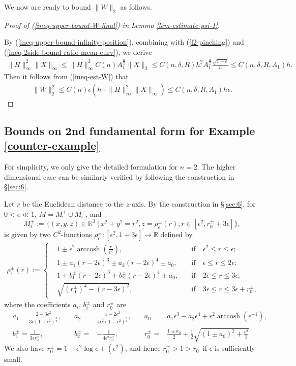 \documentclass{amsart}
\numberwithin{equation}{section}
\theoremstyle{remark}
\renewcommand{\(}{\left(}
\renewcommand{\)}{\right)}
\renewcommand{\~}{\tilde}
\renewcommand{\-}{\overline}
\newcommand{\R}{\mathbb{R}}
\renewcommand{\d}{\delta}
\newcommand{\e}{\epsilon}
\newcommand{\ra}{\rightarrow}
\begin{document}
We now are ready to bound $\|W\|_2$ as follows.
\vspace{2mm}
\begin{proof}[Proof of (\ref{ineq-upper-bound-W-final}) in Lemma \ref{lem-estimate-psi-1}]
	~
	
	By (\ref{ineq-upper-bound-infinity-position}), combining with (\ref{l2-pinching}) and (\ref{ineq-2side-bound-ratio-mean-curv}), we derive
	\begin{align*}
	\|H\|^2_\infty\|X\|_\infty \leq \|H\|_\infty^2 C(n)A_1^{\frac{n}{2}}\|X\|_2\leq C(n,\d,R)h^2 A_1^{\frac{n}{2}}\frac{\sqrt{1+\e}}{h} \leq C(n,\d,R,A_1)h.
	\end{align*}
	Then it follows from (\ref{ineq-est-W}) that
	\begin{align}\label{4.13}
	\|W\|_2^2 \leq C(n)\e(h+\|H\|_\infty^2 \|X\|_\infty) \leq C(n,\d,R,A_1)h \e.
	\end{align}
	
\end{proof}

\subsection{Bounds on 2nd fundamental form for Example \ref{counter-example}}\label{subsec-2nd-fund}

For simplicity, we only give the detailed formulation for $n=2$. The higher dimensional case can be similarly verified by following the construction in \S \ref{sec:6}.

Let $r$ be the Euclidean distance to the $z$-axis. By the construction in \S \ref{sec:6}, for $0<\e \ll 1$, $M=M_\e^{+}\cup M_\e^{-}$, and
$$M_\e^{\pm}:=\{(x,y,z)\in \mathbb R^3 ~|~x^2+y^2=r^2, z= \rho^{\pm}_\e(r), r\in [\epsilon^2,r_0^{\pm}+3\e]\},$$
is given by two $C^2$-functions $\rho_\e^{\pm}:[\e^2,1+3\e]\ra \R$ defined by
\begin{align*}
\rho^{\pm}_\e(r):=\left\{\begin{aligned}
&1\pm\e^2 \operatorname{arccosh}\(\frac{r}{\e^2}\), \quad &\text{if}~&\e^2 \leq r \leq \e;\\
&1 \pm a_1 (r-2\e)^3 \pm a_2 (r-2\e)^4 \pm a_0,   \quad &\text{if}~&\e   \leq r \leq 2\e;\\
&1+b_1^{\pm} (r-2\e)^3+b_2^{\pm} (r-2\e)^4 \pm a_0,   \quad &\text{if}~&2\e  \leq r \leq 3\e;\\
&\sqrt{(r_0^{\pm})^2-(r-3\e)^2},          \quad &\text{if}~&3\e  \leq r \leq 3\e+r_0^{\pm},
\end{aligned}
\right.
\end{align*}
where the coefficients $a_i$, $b_i^{\pm}$ and $r_0^\pm$ are
\begin{align*}
&a_1=\frac{2-3\e^2}{3\e(1-\e^2)^\frac{3}{2}}, \quad &a_2=&\frac{1-2\e^2}{4\e^2(1-\e^2)^\frac{3}{2}}, \quad &a_0=&a_1\e^3-a_2 \e^4+\e^2 \operatorname{arccosh}(\e^{-1}),\\
&b_1^{\pm}=\frac{1}{3\e r_0^\pm},           \quad &b_2^{\pm}=&-\frac{1}{4\e^2 r_0^\pm}, \quad &r_0^\pm=&\frac{1\pm a_0}{2}+\frac{1}{2}\sqrt{(1\pm a_0)^2+\frac{\e^2}{3}}
\end{align*}
We also have $r_0^{\pm}=1\mp \e^2 \log\e+(\e^2)$, and hence $r_0^{+}>1>r_0^{-}$ if $\e$ is sufficiently small.
\end{document}
